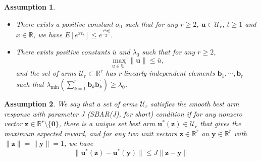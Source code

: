 \documentclass{article}
\theoremstyle{plain}
\newtheorem{assumption}{Assumption}
\theoremstyle{definition}
\begin{document}
\begin{assumption}
\begin{itemize}
\item There exists a positive constant $\sigma_{0}$ such that for any $r\geq 2$, $\textbf{u}\in \mathcal{U}_{r}$, $t\geq 1$ and $x\in \mathbb{R}$, we have $E[e^{x \epsilon_{t}}]\leq e^{\frac{x^{2}\sigma_{0}^{2}}{2}}$.
\item There exists positive constants $\bar{u}$ and $\lambda_{0}$ such that for any $r\geq 2$,
\begin{equation}
\max_{u\in \mathbb{U}^{r}}\|\textbf{u}\|\leq \bar{u}, \nonumber
\end{equation}
and the set of arms $\mathcal{U}_{r}\subset 
\mathbb{R}^{r}$ has r linearly independent elements $\textbf{b}_{1},\cdots,\textbf{b}_{r}$ such that $\lambda_{\min}(\sum_{k=1}^{r}\textbf{b}_{k}\textbf{b}_{k}^{'})\geq \lambda_{0}$.
\end{itemize}
\end{assumption}



\begin{assumption}
We say that a set of arms $\mathcal{U}_{r}$ satisfies the smooth best arm response with parameter J (SBAR(J), for short) condition if for any nonzero vector $\textbf{z}\in \mathbb{R}^{r}\setminus\{\textbf{0}\}$, there is a unique set best arm $\textbf{u}^{*}(\textbf{z})\in \mathcal{U}_{r}$ that gives the maximum expected reward, and for any two unit vectors $\textbf{z}\in \mathbb{R}^{r}$ an $\textbf{y}\in \mathbb{R}^{r}$ with $\|\textbf{z}\|=\|\textbf{y}\|=1$, we have
\begin{equation}
\|\textbf{u}^{*}(\textbf{z})-\textbf{u}^{*}(\textbf{y})\|\leq J \|\textbf{z}-\textbf{y}\| \nonumber 
\end{equation}
\end{assumption}
\end{document}
